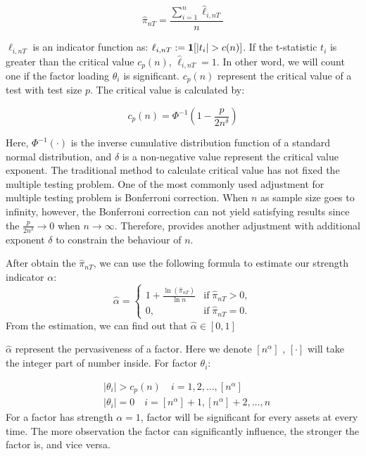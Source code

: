 \documentclass[12pt]{article}
\begin{document}
\[  \hat{\pi}_{nT} = \frac{\sum_{i=1}^n \hat{\ell}_{i,nT}}{n} \tag{2} \label{pi_function} \]

$\ell_{i,nT}$ is an indicator function as: $\ell_{i,nT} := {\bf1}[|t_{i}|>c(n)]$. 
If the t-statistic $t_i$ is greater than the critical value $c_p(n)$,  $\hat{\ell}_{i,nT} = 1$. 
In other word, we will count one if the factor loading $\hat{\theta}_{i}$ is significant. 
$c_p(n)$ represent the critical value of a test with test size $p$. 
The critical value is calculated by:

\[   c_p(n) = \Phi^{-1}(1 - \frac{p}{2n^\delta})   \tag{3} \label{critical_value_function} \]

Here, $\Phi^{-1}(\cdot)$ is the inverse cumulative distribution function of a standard normal distribution, and $\delta$ is a non-negative value represent the critical value exponent. 
The traditional method to calculate critical value has not fixed the multiple testing problem. 
One of the most commonly used adjustment for multiple testing problem is Bonferroni correction. 
When $n$ as sample size goes to infinity, however, the Bonferroni correction can not yield satisfying results since the $\frac{p}{2n^{\delta}} \to 0$ when $n \to \infty$. 
Therefore,  provides another adjustment with additional exponent $\delta$ to constrain the behaviour of $n$.

 After obtain the $\hat{\pi}_{nT}$, we can use the following formula to estimate our strength indicator $\alpha$:
\[ \hat{\alpha} = \begin{cases}
1+\frac{\ln(\hat{\pi}_{nT})}{\ln n} & \text{if}\; \hat{\pi}_{nT} > 0,\\
	0, & \text{if}\; \hat{\pi}_{nT} = 0.
\end{cases} \]
From the estimation, we can find out that $\hat{\alpha} \in [0,1]$

$\hat{\alpha}$ represent the pervasiveness of a factor. 
Here we denote $[n^{\alpha}]$ , $[\cdot]$ will take the integer part of number inside. 
For factor $\theta_{i}$:

\begin{align*}
&|\theta_{i}| > c_p(n)\quad i = 1, 2,  \dots, [n^{\alpha}]\\
&|\theta_{i}| = 0 \quad i = [n^{\alpha}] + 1, [n^{\alpha}] +2 ,\dots, n
\end{align*}
For a factor has strength $\alpha = 1$,  factor will be significant  for every assets at every time. 
The more observation the factor can significantly influence, the stronger the factor is, and vice versa.\textsl{}
\end{document}
